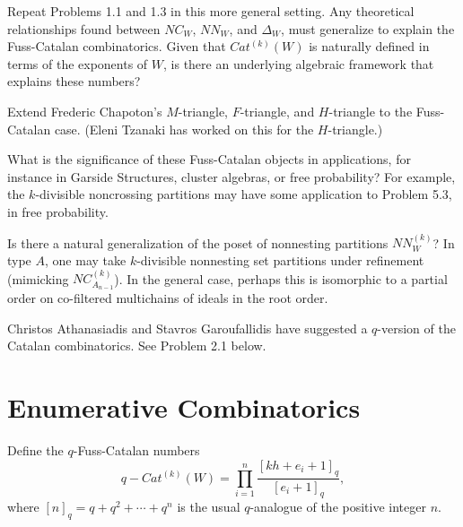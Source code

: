 \documentclass[12pt,letterpaper, reqno]{amsart}
\begin{document}
\begin{problemblock}
\begin{problem}[1.5]
Repeat Problems 1.1 and 1.3 in this more general setting. Any theoretical relationships found between $NC_W$, $NN_W$, and $\Delta_W$, must generalize to explain the Fuss-Catalan combinatorics. Given that $Cat^{(k)}(W)$ is naturally defined in terms of the exponents of $W$, is there an underlying algebraic framework that explains these numbers?
\end{problem}

\begin{remark}
Extend Frederic Chapoton's $M$-triangle, $F$-triangle, and $H$-triangle to the Fuss-Catalan case. (Eleni Tzanaki has worked on this for the $H$-triangle.)
\end{remark}

\begin{remark}
What is the significance of these Fuss-Catalan objects in applications, for instance in Garside Structures, cluster algebras, or free probability? For example, the $k$-divisible noncrossing partitions may have some application to Problem 5.3, in free probability.
\end{remark}

\begin{remark}
Is there a natural generalization of the poset of nonnesting partitions $NN^{(k)}_W$? In type $A$, one may take $k$-divisible nonnesting set partitions under refinement (mimicking $NC_{A_{n-1}}^{(k)}$). In the general case, perhaps this is isomorphic to a partial order on co-filtered multichains of ideals in the root order.
\end{remark}

\begin{remark}
Christos Athanasiadis and Stavros Garoufallidis have suggested a $q$-version of the Catalan combinatorics. See Problem 2.1 below.
\end{remark}

\end{problemblock}

\section{Enumerative Combinatorics}

Define the $q$-Fuss-Catalan numbers
$$
q-Cat^{(k)}(W)= \prod_{i=1}^n \frac{[kh+e_i+1]_q}{[e_i+1]_q},
$$
where $[n]_q=q+q^2+\cdots + q^n$ is the usual $q$-analogue of the positive integer $n$.
\end{document}
